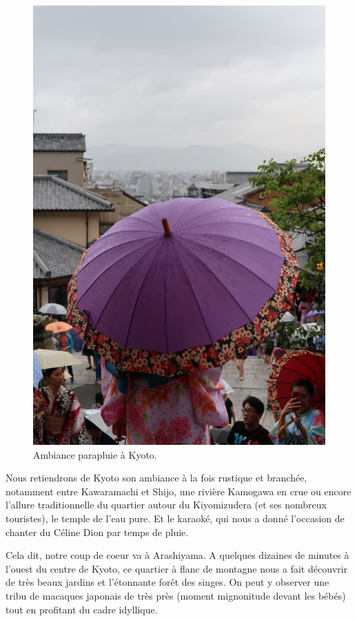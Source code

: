\begin{figure}
\centering
\includegraphics{images/20180716_kyoto.JPG}
\caption{Ambiance parapluie à Kyoto.}
\end{figure}

Nous retiendrons de Kyoto son ambiance à la fois rustique et branchée,
notamment entre Kawaramachi et Shijo, une rivière Kamogawa en crue ou
encore l'allure traditionnelle du quartier autour du Kiyomizudera (et
ses nombreux touristes), le temple de l'eau pure. Et le karaoké, qui
nous a donné l'occasion de chanter du Céline Dion par temps de pluie.

Cela dit, notre coup de coeur va à Arashiyama. A quelques dizaines de
minutes à l'ouest du centre de Kyoto, ce quartier à flanc de montagne
nous a fait découvrir de très beaux jardins et l'étonnante forêt des
singes. On peut y observer une tribu de macaques japonais de très près
(moment mignonitude devant les bébés) tout en profitant du cadre
idyllique.

